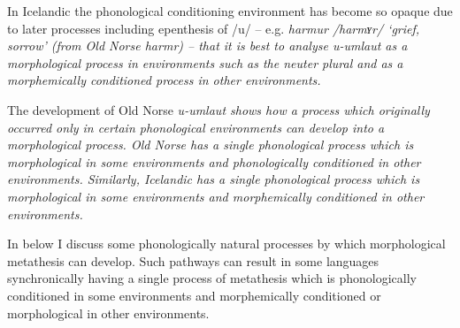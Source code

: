 In Icelandic the phonological conditioning
environment has become so opaque due to later
processes including epenthesis of /u/ -- e.g.
\it{harmur} /harmʏr/ `grief, sorrow' (from Old Norse \it{harmr}) --
that it is best to analyse \it{u}-umlaut as a
morphological process in environments such as the neuter plural
and as a morphemically conditioned process in other environments.

The development of Old Norse \it{u}-umlaut shows how a
process which originally occurred only in certain phonological environments
can develop into a morphological process.
Old Norse has a single phonological process which is morphological
in some environments and phonologically conditioned in other environments.
Similarly, Icelandic has a single phonological process which is morphological
in some environments and morphemically conditioned in other environments.

In  below I discuss some phonologically natural processes
by which morphological metathesis can develop.
Such pathways can result in some languages synchronically having a single process of metathesis
which is phonologically conditioned in some environments
and morphemically conditioned or morphological in other environments.
